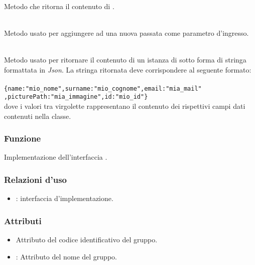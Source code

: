 \begin{description}
	\item{}\\
	Metodo che ritorna il contenuto di .
	\item{}\\
	Metodo usato per aggiungere ad  una nuova  passata come parametro d'ingresso.
	\item{}\\
	Metodo usato per ritornare il contenuto di un istanza di  sotto forma di stringa formattata in \textit{Json}. La stringa ritornata deve corrispondere al seguente formato:\\\\
	\verb|{name:"mio_nome",surname:"mio_cognome",email:"mia_mail"|\\\verb|,picturePath:"mia_immagine",id:"mio_id"}|\\
	
	dove i valori tra virgolette rappresentano il contenuto dei rispettivi campi dati contenuti nella classe.
\end{description}


\subsubsection*{Funzione}
Implementazione dell'interfaccia .

\subsubsection*{Relazioni d'uso}

\begin{itemize}
	\item {}: interfaccia d'implementazione.
\end{itemize}

\subsubsection*{Attributi}

\begin{itemize}
	\item{}
	Attributo del codice identificativo del gruppo.
	\item{}:
	Attributo del nome del gruppo.
\end{itemize}

